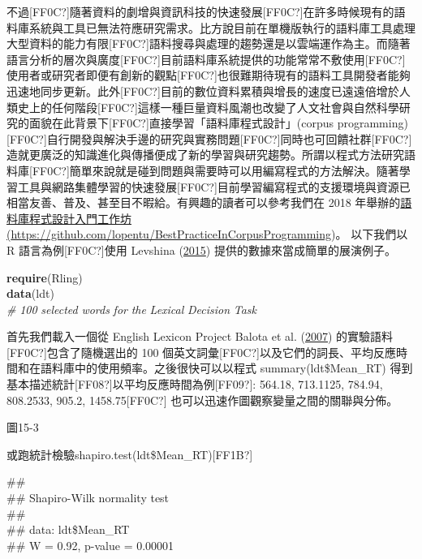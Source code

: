 不過[FF0C?]隨著資料的劇增與資訊科技的快速發展[FF0C?]在許多時候現有的語料庫系統與工具已無法符應研究需求。比方說目前在單機版執行的語料庫工具處理大型資料的能力有限[FF0C?]語料搜尋與處理的趨勢還是以雲端運作為主。而隨著語言分析的層次與廣度[FF0C?]目前語料庫系統提供的功能常常不敷使用[FF0C?]使用者或研究者即便有創新的觀點[FF0C?]也很難期待現有的語料工具開發者能夠迅速地同步更新。此外[FF0C?]目前的數位資料累積與增長的速度已遠遠倍增於人類史上的任何階段[FF0C?]這樣一種巨量資料風潮也改變了人文社會與自然科學研究的面貌在此背景下[FF0C?]直接學習「語料庫程式設計」(corpus programming)[FF0C?]自行開發與解決手邊的研究與實務問題[FF0C?]同時也可回饋社群[FF0C?]造就更廣泛的知識進化與傳播便成了新的學習與研究趨勢。所謂以程式方法研究語料庫[FF0C?]簡單來說就是碰到問題與需要時可以用編寫程式的方法解決。隨著學習工具與網路集體學習的快速發展[FF0C?]目前學習編寫程式的支援環境與資源已相當友善、普及、甚至目不暇給。有興趣的讀者可以參考我們在 2018 年舉辦的\href{https://github.com/lopentu/BestPracticeInCorpusProgramming}{語料庫程式設計入門工作坊}\href{https://github.com/lopentu/BestPracticeInCorpusProgramming}{(}\url{https://github.com/lopentu/BestPracticeInCorpusProgramming})。 以下我們以 R 語言為例[FF0C?]使用 Levshina (\hyperlink{bookmarkid3tbugp1}{2015}) 提供的數據來當成簡單的展演例子。

\textbf{require}(Rling)\\
\textbf{data}(ldt)\\
\textit{\#} \textit{100} \textit{selected} \textit{words} \textit{for} \textit{the} \textit{Lexical} \textit{Decision} \textit{Task}

首先我們載入一個從 English Lexicon Project Balota et al. (\hyperlink{bookmarkid32hioqz}{2007}) 的實驗語料[FF0C?]包含了隨機選出的 100 個英文詞彙[FF0C?]以及它們的詞長、平均反應時間和在語料庫中的使用頻率。之後很快可以以程式 summary(ldt\$Mean\_RT) 得到基本描述統計[FF08?]以平均反應時間為例[FF09?]: 564.18, 713.1125, 784.94, 808.2533, 905.2, 1458.75[FF0C?] 也可以迅速作圖觀察變量之間的關聯與分佈。

  
 

圖15-3

或跑統計檢驗shapiro.test(ldt\$Mean\_RT)[FF1B?]

\#\# \\
\#\#  Shapiro-Wilk normality test\\
\#\# \\
\#\# data:  ldt\$Mean\_RT\\
\#\# W = 0.92, p-value = 0.00001

